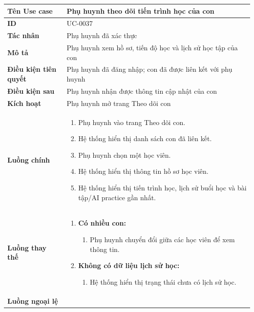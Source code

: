 {
\small
\renewcommand{\arraystretch}{1.15}

\begin{tabularx}{\textwidth}{|>{\raggedright\arraybackslash}p{3.5cm}|>{\raggedright\arraybackslash}X|}
\hline
\textbf{Tên Use case} & Phụ huynh theo dõi tiến trình học của con \\
\hline
\textbf{ID} & UC-0037 \\
\hline
\textbf{Tác nhân} & Phụ huynh đã xác thực \\
\hline
\textbf{Mô tả} & Phụ huynh xem hồ sơ, tiến độ học và lịch sử học tập của con \\
\hline
\textbf{Điều kiện tiên quyết} & Phụ huynh đã đăng nhập; con đã được liên kết với phụ huynh \\
\hline
\textbf{Điều kiện sau} & Phụ huynh nhận được thông tin cập nhật của con \\
\hline
\textbf{Kích hoạt} & Phụ huynh mở trang Theo dõi con \\
\hline
\textbf{Luồng chính} &
\begin{enumerate}
    \item Phụ huynh vào trang Theo dõi con.
    \item Hệ thống hiển thị danh sách con đã liên kết.
    \item Phụ huynh chọn một học viên.
    \item Hệ thống hiển thị thông tin hồ sơ học viên.
    \item Hệ thống hiển thị tiến trình học, lịch sử buổi học và bài tập/AI practice gần nhất.
\end{enumerate} \\
\hline
\textbf{Luồng thay thế} &
\begin{enumerate}
    \item \textbf{Có nhiều con:}
    \begin{enumerate}
        \item[3A.] Phụ huynh chuyển đổi giữa các học viên để xem thông tin.
    \end{enumerate}
    \item \textbf{Không có dữ liệu lịch sử học:}
    \begin{enumerate}
        \item[5B.] Hệ thống hiển thị trạng thái chưa có lịch sử học.
    \end{enumerate}
\end{enumerate} \\
\hline
\textbf{Luồng ngoại lệ} &
\begin{enumerate}

\end{enumerate}
\end{tabularx}}
